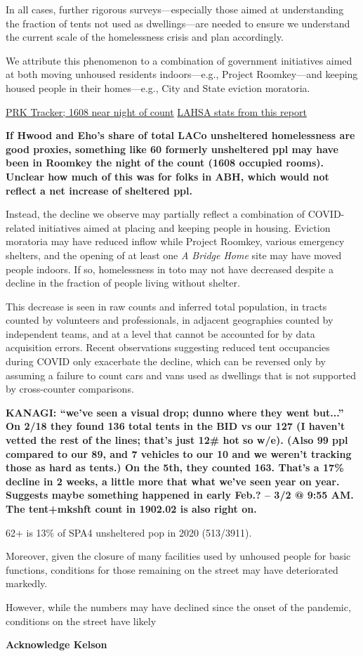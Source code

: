 \documentclass[11pt]{article}
\def\bfr{\bf\color{red}}
\begin{document}
\indent In all cases, further rigorous surveys---especially those aimed at understanding the fraction of
tents not used as  dwellings---are needed to ensure we understand the current scale of the 
homelessness crisis and plan accordingly.

We attribute this phenomenon to a combination of government initiatives aimed at both moving unhoused
residents indoors---e.g., Project Roomkey---and keeping housed people in their homes---e.g., City and State
eviction moratoria. 

\href{https://projectroomkeytracker.com/}{PRK Tracker; 1608 near night of count}
\href{https://www.lahsa.org/documents?id=4686-2020-greater-los-angeles-city-community-homelessness-report-service-planning-area-4.pdf}{LAHSA stats from this report}

{\bfr If Hwood and Eho's share of total LACo unsheltered homelessness are good proxies, something
like 60 formerly unsheltered ppl may have been in Roomkey the night of the count (1608 occupied rooms). 
Unclear how much of this was for folks in ABH, which would not reflect a net increase of sheltered ppl.}

Instead, the decline we observe may partially reflect a combination of COVID-related initiatives aimed at placing 
and keeping people in housing. Eviction moratoria may have reduced inflow while Project Roomkey, various 
emergency shelters, and the opening of at least one {\it A Bridge Home} site may have moved people indoors. If so, 
homelessness in toto may not have decreased despite a decline in the fraction of people living without shelter. 


This decrease is seen in raw counts and inferred total
population, in tracts counted by volunteers and professionals, in adjacent geographies counted by independent
teams, and at a level that cannot be accounted for by data acquisition errors. Recent observations suggesting
reduced tent occupancies during COVID only exacerbate the decline, which can be reversed only by assuming
a failure to count cars and vans used as dwellings that is not supported by cross-counter comparisons.

{\bfr KANAGI: ``we've seen a visual drop; dunno where they went but...'' On 2/18 they found 136 
total tents in the BID vs our 127 (I haven't vetted the rest of the lines; that's just 12\# hot so w/e). (Also 99
ppl compared to our 89, and 7 vehicles to our 10 and we weren't tracking those as hard as tents.) 
On the 5th, they counted 163. That's a 17\% decline in 2 weeks, a little more that what we've seen year on year.
Suggests maybe something happened in early Feb.? -- 3/2 @ 9:55 AM. The tent+mkshft count in 1902.02 is also 
right on.

62+ is 13\% of SPA4 unsheltered pop in 2020 (513/3911).}

Moreover, given the closure
of many facilities used by unhoused people for basic functions, conditions for those remaining on the street may
have deteriorated markedly. 

However, while the numbers may have declined since the onset of the pandemic, conditions on the street
have likely 


{\bfr Acknowledge Kelson}
\end{document}
